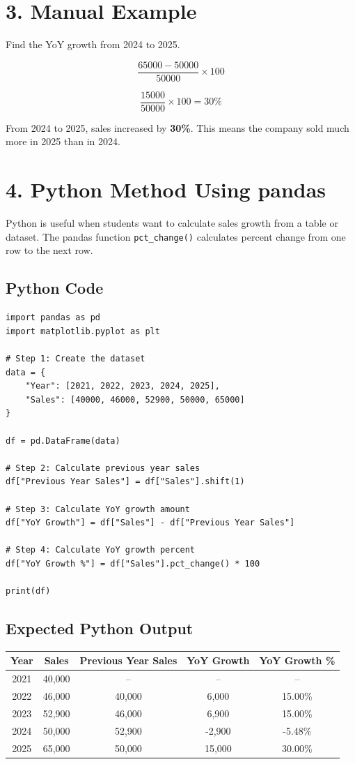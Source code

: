 \documentclass[11pt]{article}
\begin{document}
\section{3. Manual Example}
Find the YoY growth from 2024 to 2025.

\[
\frac{65000 - 50000}{50000} \times 100
\]

\[
\frac{15000}{50000} \times 100 = 30\%
\]

\begin{tcolorbox}[colback=LightBlue,colframe=DeepNavy,title=Conclusion]
From 2024 to 2025, sales increased by \textbf{30\%}. This means the company sold much more in 2025 than in 2024.
\end{tcolorbox}

\section{4. Python Method Using pandas}
Python is useful when students want to calculate sales growth from a table or dataset. The pandas function \texttt{pct\_change()} calculates percent change from one row to the next row.

\subsection{Python Code}
\begin{lstlisting}[style=pythonstyle]
import pandas as pd
import matplotlib.pyplot as plt

# Step 1: Create the dataset
data = {
    "Year": [2021, 2022, 2023, 2024, 2025],
    "Sales": [40000, 46000, 52900, 50000, 65000]
}

df = pd.DataFrame(data)

# Step 2: Calculate previous year sales
df["Previous Year Sales"] = df["Sales"].shift(1)

# Step 3: Calculate YoY growth amount
df["YoY Growth"] = df["Sales"] - df["Previous Year Sales"]

# Step 4: Calculate YoY growth percent
df["YoY Growth %"] = df["Sales"].pct_change() * 100

print(df)
\end{lstlisting}

\subsection{Expected Python Output}
\begin{center}
\begin{tabular}{ccccc}
\toprule
\textbf{Year} & \textbf{Sales} & \textbf{Previous Year Sales} & \textbf{YoY Growth} & \textbf{YoY Growth \%} \\
\midrule
2021 & 40,000 & -- & -- & -- \\
2022 & 46,000 & 40,000 & 6,000 & 15.00\% \\
2023 & 52,900 & 46,000 & 6,900 & 15.00\% \\
2024 & 50,000 & 52,900 & -2,900 & -5.48\% \\
2025 & 65,000 & 50,000 & 15,000 & 30.00\% \\
\bottomrule
\end{tabular}
\end{center}
\end{document}
